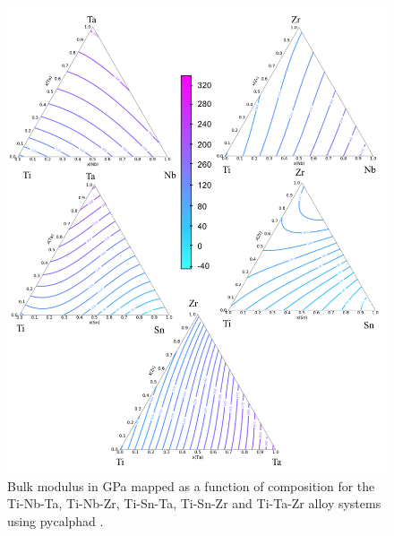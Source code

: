 \pagebreak
\begin{figure}[H]
	\centering
	\includegraphics[width=\textwidth]{Chapter-6/Figures/tixybulk2.png}
	\caption{Bulk modulus in GPa mapped as a function of composition for the Ti-Nb-Ta, Ti-Nb-Zr, Ti-Sn-Ta, Ti-Sn-Zr and Ti-Ta-Zr alloy systems using pycalphad \cite{Otis2017}.}
	\label{Ch6-figure:tixybulk2}
\end{figure}

